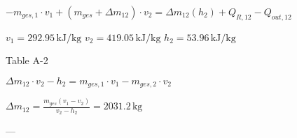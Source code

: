 \( -m_{ges,1} \cdot v_1 + (m_{ges} + \Delta m_{12}) \cdot v_2 = \Delta m_{12} (h_2) + Q_{R,12} - Q_{out,12} \)  

\( v_1 = 292.95 \, \text{kJ/kg} \)  
\( v_2 = 419.05 \, \text{kJ/kg} \)  
\( h_2 = 53.96 \, \text{kJ/kg} \)  

Table A-2  

\( \Delta m_{12} \cdot v_2 - h_2 = m_{ges,1} \cdot v_1 - m_{ges,2} \cdot v_2 \)  

\( \Delta m_{12} = \frac{m_{ges} (v_1 - v_2)}{v_2 - h_2} = 2031.2 \, \text{kg} \)  

---